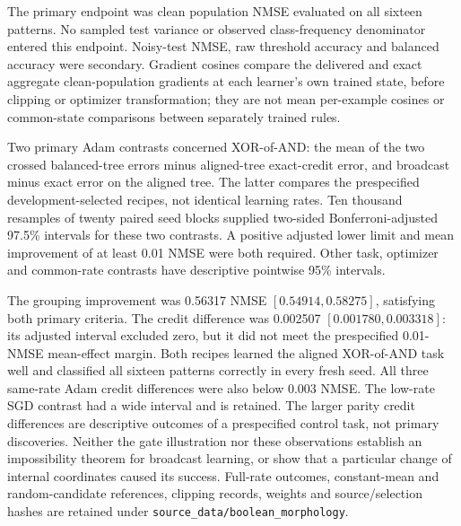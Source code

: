 The primary endpoint was clean population NMSE evaluated on all sixteen
patterns. No sampled test variance or observed class-frequency denominator
entered this endpoint. Noisy-test NMSE, raw threshold accuracy and balanced
accuracy were secondary. Gradient cosines compare the delivered and exact
aggregate clean-population gradients at each learner's own trained state,
before clipping or optimizer transformation; they are not mean per-example
cosines or common-state comparisons between separately trained rules.

Two primary Adam contrasts concerned XOR-of-AND: the mean of the two crossed
balanced-tree errors minus aligned-tree exact-credit error, and broadcast
minus exact error on the aligned tree. The latter compares the
prespecified development-selected recipes, not identical learning rates.
Ten thousand resamples of twenty paired seed blocks supplied two-sided
Bonferroni-adjusted 97.5\% intervals for these two contrasts. A positive
adjusted lower limit and mean improvement of at least 0.01 NMSE were both
required. Other task, optimizer and common-rate contrasts have descriptive
pointwise 95\% intervals.

The grouping improvement was 0.56317 NMSE $[0.54914,0.58275]$, satisfying both
primary criteria. The credit difference was 0.002507
$[0.001780,0.003318]$: its adjusted interval excluded zero, but it did not
meet the prespecified 0.01-NMSE mean-effect margin. Both recipes learned the
aligned XOR-of-AND task well and classified all sixteen patterns correctly
in every fresh seed. All three same-rate Adam credit differences
were also below 0.003 NMSE. The low-rate SGD contrast had a wide interval and
is retained. The larger parity credit differences are descriptive outcomes
of a prespecified control task, not primary discoveries. Neither the gate
illustration nor these observations establish an impossibility theorem for
broadcast learning, or show that a particular change of internal coordinates
caused its success. Full-rate outcomes, constant-mean and random-candidate
references, clipping records, weights and source/selection hashes are retained
under \texttt{source\_data/boolean\_morphology}.


